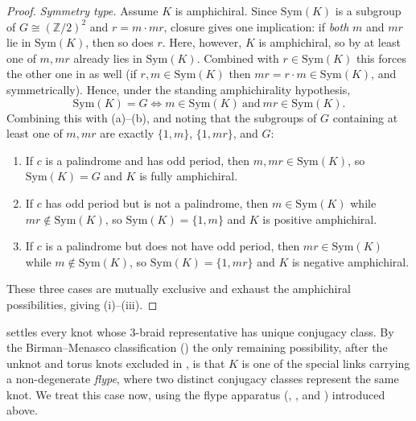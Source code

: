 \documentclass[11pt]{article}
\theoremstyle{definition}
\begin{document}
\begin{proof}
\smallskip
\noindent\emph{Symmetry type.} Assume $K$ is amphichiral. Since $\mathrm{Sym}(K)$ is a
subgroup of $G\cong(\mathbb{Z}/2)^{2}$ and $r=m\cdot mr$, closure gives one implication:
if \emph{both} $m$ and $mr$ lie in $\mathrm{Sym}(K)$, then so does $r$. Here, however, $K$ is amphichiral, so by
 at least one of $m,mr$ already lies in $\mathrm{Sym}(K)$.
Combined with $r\in\mathrm{Sym}(K)$ this forces the other one in as well (if
$r,m\in\mathrm{Sym}(K)$ then $mr=r\cdot m\in\mathrm{Sym}(K)$, and symmetrically). Hence,
under the standing amphichirality hypothesis,
\[
\mathrm{Sym}(K)=G
\iff m\in\mathrm{Sym}(K)\ \text{and}\ mr\in\mathrm{Sym}(K).
\]
Combining this with (a)--(b), and noting that the subgroups of $G$ containing at least one
of $m,mr$ are exactly $\{1,m\}$, $\{1,mr\}$, and $G$:
\begin{enumerate}[label=\textup{(\roman*)}]
\item If $c$ is a palindrome and has odd period, then $m,mr\in\mathrm{Sym}(K)$, so
$\mathrm{Sym}(K)=G$ and $K$ is fully amphichiral.
\item If $c$ has odd period but is not a palindrome, then $m\in\mathrm{Sym}(K)$ while
$mr\notin\mathrm{Sym}(K)$, so $\mathrm{Sym}(K)=\{1,m\}$ and $K$ is positive amphichiral.
\item If $c$ is a palindrome but does not have odd period, then $mr\in\mathrm{Sym}(K)$
while $m\notin\mathrm{Sym}(K)$, so $\mathrm{Sym}(K)=\{1,mr\}$ and $K$ is negative
amphichiral.
\end{enumerate}
These three cases are mutually exclusive and exhaust the amphichiral possibilities,
giving (i)--(iii).
\end{proof}

\noindent {} settles every knot whose $3$-braid
representative has unique conjugacy class. By the Birman--Menasco classification
() the only remaining possibility, after the unknot and torus knots
excluded in , is that $K$ is one of the special links carrying a
non-degenerate \emph{flype}, where two distinct conjugacy classes represent the same
knot. We treat this case now, using the flype apparatus (,
, and ) introduced above.
\end{document}
